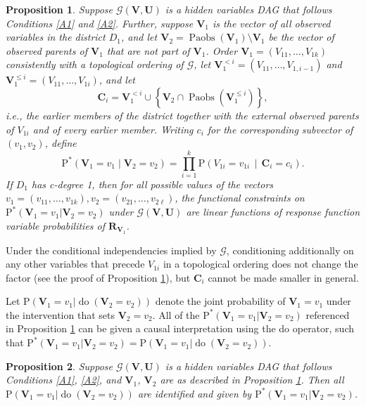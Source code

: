 \documentclass[12pt]{article}
\newtheorem{proposition}{Proposition}
\def\Pr{{\mathrm{P}}}
\def\Pdo{{\mathrm{P}^*}}
\DeclareMathOperator{\Paobs}{Paobs}
\newcommand{\bU}{\boldsymbol{U}}
\newcommand{\bV}{\boldsymbol{V}}
\DeclareMathOperator{\Do}{do}
\begin{document}
\begin{proposition} \label{prop:ident}
Suppose $\mathcal{G}(\bV, \bU)$ is a hidden variables DAG that follows Conditions \ref{A1} and \ref{A2}. Further, suppose $\bV_1$ is the vector of all observed variables in the district $D_1$, and let $\bV_2 = \Paobs(\bV_1) \setminus \bV_1$ be the vector of observed parents of $\bV_1$ that are not part of $\bV_1$. Order $\bV_1=(V_{11},\ldots,V_{1k})$ consistently with a topological ordering of $\mathcal{G}$, let $\bV_1^{<i}=(V_{11},\ldots,V_{1,i-1})$ and $\bV_1^{\leq i} = (V_{11},\ldots,V_{1i})$, and let
\[
\boldsymbol{C}_{i} = \bV_1^{<i} \cup \left\{\bV_2 \cap \Paobs(\bV_1^{\leq i})\right\},
\]
i.e., the earlier members of the district together with the external observed parents of $V_{1i}$ and of every earlier member. Writing $c_i$ for the corresponding subvector of $(v_1, v_2)$, define
\[
    \Pdo(\bV_1=v_1\mid \bV_2=v_2)
    =
    \prod_{i=1}^k
    \Pr\!\left(
        V_{1i}=v_{1i}
        \,\middle|\,
        \boldsymbol{C}_{i} = c_i
    \right).
\]
If $D_1$ has c-degree 1, then for all possible values of the vectors $v_1 = (v_{11}, \ldots, v_{1k}), v_2 = (v_{21}, \ldots, v_{2\ell})$, the functional constraints on $\Pdo(\bV_1 = v_{1} |\bV_2 = v_2)$ under $\mathcal{G}(\bV, \bU)$ are linear functions of response function variable probabilities of $\mathbf{R}_{\bV_1}$.
\end{proposition}

Under the conditional independencies implied by $\mathcal{G}$, conditioning additionally on any other variables that precede $V_{1i}$ in a topological ordering does not change the factor (see the proof of Proposition \ref{prop:ident}), but $\boldsymbol{C}_i$ cannot be made smaller in general.

Let $\Pr(\bV_1 = v_1 | \Do(\bV_2 = v_2))$ denote the joint probability of $\bV_1 = v_1$ under the intervention that sets $\bV_2 = v_2$. All of the $\Pdo(\bV_1 = v_{1} |\bV_2 = v_2)$ referenced in Proposition \ref{prop:ident} can be given a causal interpretation using the do operator, such that $\Pdo(\bV_1 = v_{1} |\bV_2 = v_2) =  \Pr(\bV_1 = v_{1} | \Do(\bV_2 = v_2))$. 

\begin{proposition} \label{causalprop}
Suppose $\mathcal{G}(\bV, \bU)$ is a hidden variables DAG that follows Conditions \ref{A1}, \ref{A2}, and $\bV_1$, $\bV_2$ are as described in Proposition \ref{prop:ident}. Then all $\Pr(\bV_1 = v_{1} | \Do(\bV_2 = v_2))$ are identified and given by $\Pdo(\bV_1 = v_1|\bV_2=v_2)$. 
\end{proposition}
\end{document}
